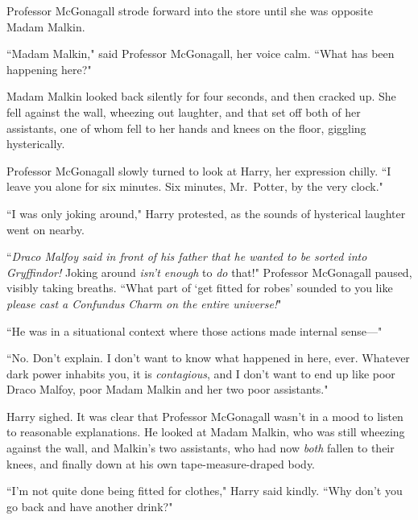 Professor McGonagall strode forward into the store until she was opposite Madam Malkin.

``Madam Malkin," said Professor McGonagall, her voice calm. ``What has been happening here?"

Madam Malkin looked back silently for four seconds, and then cracked up. She fell against the wall, wheezing out laughter, and that set off both of her assistants, one of whom fell to her hands and knees on the floor, giggling hysterically.

Professor McGonagall slowly turned to look at Harry, her expression chilly. ``I leave you alone for six minutes. Six minutes, Mr.~Potter, by the very clock."

``I was only joking around," Harry protested, as the sounds of hysterical laughter went on nearby.

``\emph{Draco Malfoy said in front of his father that he wanted to be sorted into Gryffindor!} Joking around \emph{isn't enough} to \emph{do} that!" Professor McGonagall paused, visibly taking breaths. ``What part of `get fitted for robes' sounded to you like \emph{please cast a Confundus Charm on the entire universe!}"

``He was in a situational context where those actions made internal sense---"

``No. Don't explain. I don't want to know what happened in here, ever. Whatever dark power inhabits you, it is \emph{contagious}, and I don't want to end up like poor Draco Malfoy, poor Madam Malkin and her two poor assistants."

Harry sighed. It was clear that Professor McGonagall wasn't in a mood to listen to reasonable explanations. He looked at Madam Malkin, who was still wheezing against the wall, and Malkin's two assistants, who had now \emph{both} fallen to their knees, and finally down at his own tape-measure-draped body.

``I'm not quite done being fitted for clothes," Harry said kindly. ``Why don't you go back and have another drink?"

